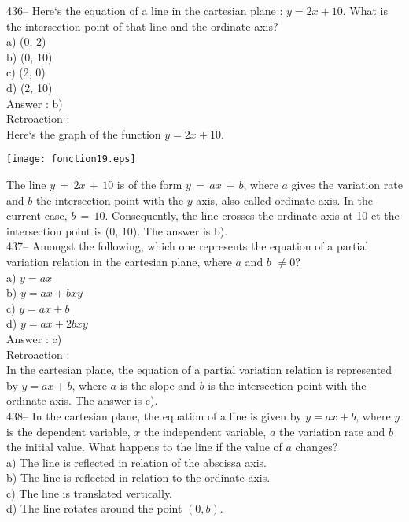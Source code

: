﻿\documentclass[letterpaper, 12pt]{article}
\begin{document}
436-- Here`s the equation of a line in the cartesian plane : $y=2x+10$.
What is the intersection point of that line and the ordinate axis?\\
a) (0, 2)\\
b) (0, 10)\\
c) (2, 0)\\
d) (2, 10)\\

Answer :  b)\\

Retroaction : \\
Here`s the graph of the function $y=2x+10$.\\
    \begin{center}
    \texttt{[image: fonction19.eps]}
    \end{center}

The line $y\,=\,2x\,+\,10$ is of the form $y\,=\,ax\,+\,b$, where
$a$ gives the variation rate and $b$ the intersection point with the $y$ axis, also called ordinate axis.
In the current case, $b\,=\,10$.  Consequently, the line crosses the ordinate axis at 10 et the intersection point is
(0, 10). The answer is
b).\\

437-- Amongst the following, which one represents the equation of a partial variation relation in the cartesian plane, where $a$ and
$b$ $\neq0$?\\
a) $y=ax$\\
b) $y=ax+bxy$\\
c) $y=ax+b$\\
d) $y=ax+2bxy$\\


Answer : c)\\

Retroaction : \\
In the cartesian plane, the equation of a partial variation relation is represented by $y=ax+b$, where $a$ is the slope and $b$ is the intersection point with the ordinate axis.  The answer is c).\\

438-- In the cartesian plane, the equation of a line is given by $y=ax+b$, where $y$ is the dependent variable, $x$ the independent variable, $a$ the variation rate and $b$ the initial value.
What happens to the line if the value of $a$ changes?\\
a) The line is reflected in relation of the abscissa axis.\\
b) The line is reflected in relation to the ordinate axis.\\
c) The line is translated vertically.\\
d) The line rotates around the point $(0,b)$.\\
\end{document}
